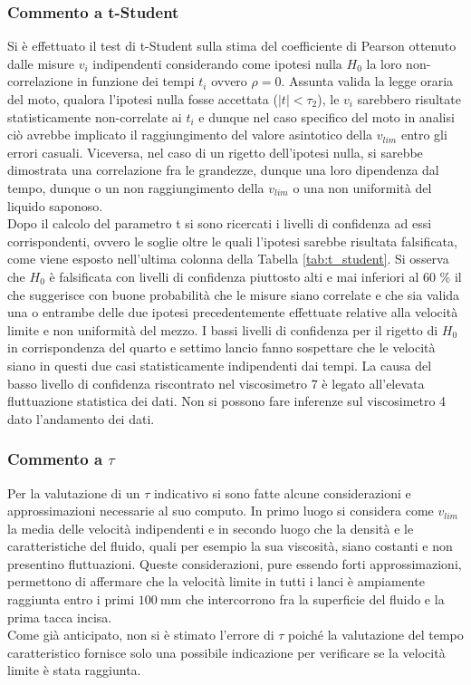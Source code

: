\documentclass[a4paper,11pt,oneside]{article}
\begin{document}
\subsubsection*{Commento a t-Student} %
Si è effettuato il test di t-Student sulla stima del coefficiente di Pearson ottenuto dalle misure $v_{i}$ indipendenti considerando come ipotesi nulla $H_{0}$ la loro non-correlazione in funzione dei tempi $t_{i}$ ovvero $\rho=0$.
Assunta valida la legge oraria del moto, qualora l'ipotesi nulla fosse accettata ($|t| < \tau_{2}$), le $v_{i}$ sarebbero risultate statisticamente non-correlate ai $t_{i}$ e dunque nel caso specifico del moto in analisi ciò avrebbe implicato il raggiungimento del valore asintotico della $v_{lim}$ entro gli errori casuali. Viceversa, nel caso di un rigetto dell'ipotesi nulla, si sarebbe dimostrata una correlazione fra le grandezze, dunque una loro dipendenza dal tempo, dunque o un non raggiungimento della $v_{lim}$ o una non uniformità del liquido saponoso.\\
Dopo il calcolo del parametro t si sono ricercati i livelli di confidenza ad essi corrispondenti, ovvero le soglie oltre le quali l'ipotesi sarebbe risultata falsificata, come viene esposto nell'ultima colonna della Tabella \ref{tab:t_student}.
Si osserva che $H_{0}$ è falsificata con livelli di confidenza piuttosto alti e mai inferiori al 60 \% il che suggerisce con buone probabilità che le misure siano correlate e che sia valida una o entrambe delle due ipotesi precedentemente effettuate relative alla velocità limite e non uniformità del mezzo.\newline
I bassi livelli di confidenza per il rigetto di $H_{0}$ in corrispondenza del quarto e settimo lancio fanno sospettare che le velocità siano in questi due casi statisticamente indipendenti dai tempi. La causa del basso livello di confidenza riscontrato nel viscosimetro 7 è legato all'elevata fluttuazione statistica dei dati. Non si possono fare inferenze sul viscosimetro 4 dato l'andamento dei dati.

\subsubsection*{Commento a $\tau$}
Per la valutazione di un $\tau$ indicativo si sono fatte alcune considerazioni e approssimazioni necessarie al suo computo. In primo luogo si considera come $v_{lim}$ la media delle velocità indipendenti e in secondo luogo che la densità e le caratteristiche del fluido, quali per esempio la sua viscosità, siano costanti e non presentino fluttuazioni.
Queste considerazioni, pure essendo forti approssimazioni, permettono di affermare che la velocità limite in tutti i lanci è ampiamente raggiunta entro i primi $\SI{100}{\milli\metre}$ che intercorrono fra la superficie del fluido e la prima tacca incisa.\\
Come già anticipato, non si è stimato l'errore di $\tau$ poiché la valutazione del tempo caratteristico fornisce solo una possibile indicazione per verificare se la velocità limite è stata raggiunta.\newline
\end{document}
